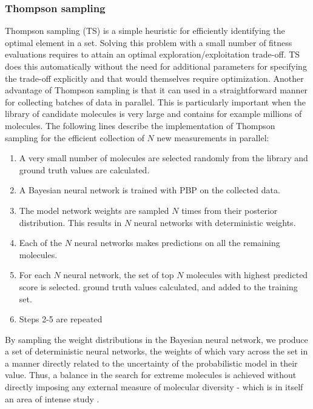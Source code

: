 \subsubsection{Thompson sampling}

Thompson sampling (TS) \cite{Thompson_1933} is a simple heuristic for efficiently identifying the optimal element in a set. Solving this problem with a small number of fitness evaluations requires to attain an optimal exploration/exploitation trade-off. TS does this automatically without the need for additional parameters for specifying the trade-off explicitly and that would themselves require optimization. Another advantage of Thompson sampling is that it can used in a straightforward manner for collecting batches of data in parallel. This is 
particularly important when the library of candidate molecules is very large and contains for example millions of molecules.
The following lines describe the implementation of Thompson sampling for the efficient collection of $N$ new measurements in parallel:
\begin{enumerate}
\item A very small number of molecules are selected randomly from the library and ground truth values are calculated.
\item A Bayesian neural network is trained with PBP on the collected data.
\item The model network weights are sampled $N$ times from their posterior distribution. This results in $N$ neural networks with deterministic weights.
\item Each of the $N$ neural networks makes predictions on all the remaining molecules.
\item For each $N$ neural network, the set of top $N$ molecules with highest predicted score is selected.
ground truth values calculated, and added to the training set.
\item Steps 2-5 are repeated
\end{enumerate}
By sampling the weight distributions in the Bayesian neural network, we produce a set of deterministic neural networks, the weights of which vary across the set in a manner directly related to the uncertainty of the probabilistic model in their value.  Thus, a balance in the search for extreme molecules is achieved without directly imposing any external measure of molecular diversity - which is in itself an area of intense study \cite{Maldonado_2006}.